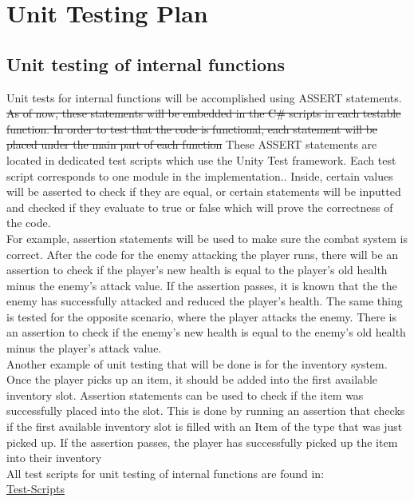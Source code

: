 \documentclass[12pt, titlepage]{article}
\DeclareRobustCommand{\hsout}[1]{\texorpdfstring{\sout{#1}}{#1}}
\begin{document}
\section{Unit Testing Plan}

\subsection{Unit testing of internal functions}

Unit tests for internal functions will be accomplished using ASSERT statements. \hsout{As of now, these statements will be embedded in the C\# scripts in each testable function. In order to test that the code is functional, each statement will be placed under the main part of each function} {\color{magenta} These ASSERT statements are located in dedicated test scripts which use the Unity Test framework. Each test script corresponds to one module in the implementation.}. Inside, certain values will be asserted to check if they are equal, or certain statements will be inputted and checked if they evaluate to true or false which will prove the correctness of the code.   \\

For example, assertion statements will be used to make sure the combat system is correct. After the code for the enemy attacking the player runs, there will be an assertion to check if the player's new health is equal to the player's old health minus the enemy's attack value. If the assertion passes, it is known that the the enemy has successfully attacked and reduced the player's health. The same thing is tested for the opposite scenario, where the player attacks the enemy. There is an assertion to check if the enemy's new health is equal to the enemy's old health minus the player's attack value. \\

Another example of unit testing that will be done is for the inventory system. Once the player picks up an item, it should be added into the first available inventory slot. Assertion statements can be used to check if the item was successfully placed into the slot. This is done by running an assertion that checks if the first available inventory slot is filled with an Item of the type that was just picked up. If the assertion passes, the player has successfully picked up the item into their inventory\\

{\color{magenta} All test scripts for unit testing of internal functions are found in: \\
\href{https://gitlab.cas.mcmaster.ca/jonatans/Zombie\_Survival\_Kit/tree/Brian\_Final/src/Zombie\%20Survival\%20Kit/Assets/Scripts/Test\%20Scripts}{Test-Scripts} \\}
\end{document}
